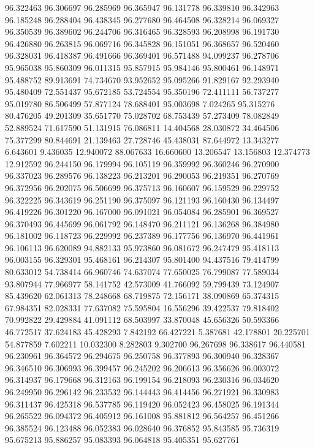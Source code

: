 96.322463
96.306697
96.285969
96.365947
96.131778
96.339810
96.342963
96.185248
96.288404
96.438345
96.277680
96.464508
96.328214
96.069327
96.350539
96.389602
96.244706
96.316465
96.328593
96.208998
96.191730
96.426880
96.263815
96.069716
96.345828
96.151051
96.368657
96.520460
96.328031
96.418387
96.491666
96.369401
96.571488
94.099237
96.278706
95.965038
95.860309
96.011315
95.857915
95.984146
95.800461
96.148971
95.488752
89.913691
74.734670
93.952652
95.095266
91.829167
92.293940
95.480409
72.551437
95.672185
53.724554
95.350196
72.411111
56.737277
95.019780
86.506499
57.877124
78.688401
95.003698
7.024265
95.315276
80.476205
49.201309
35.651770
75.028702
68.753439
57.273409
78.082849
52.889524
71.617590
51.131915
76.086811
14.404568
28.030872
34.464506
75.377299
80.844691
21.139463
27.728746
45.438031
87.644972
13.343277
6.643601
9.436035
12.940072
88.067633
16.660600
13.206547
13.156803
12.374773
12.912592
96.244150
96.179994
96.105119
96.359992
96.360246
96.270900
96.337023
96.289576
96.138223
96.213201
96.290053
96.219351
96.270769
96.372956
96.202075
96.506699
96.375713
96.160607
96.159529
96.229752
96.322225
96.343619
96.251190
96.375097
96.121193
96.160430
96.134497
96.419226
96.301220
96.167000
96.091021
96.054084
96.285901
96.369527
96.370493
96.445699
96.061792
96.148470
96.211121
96.136268
96.384980
96.181002
96.118723
96.229992
96.237389
96.177756
96.136970
96.441961
96.106113
96.620089
94.882133
95.973860
96.081672
96.247479
95.418113
96.003155
96.329301
95.468161
96.214307
95.801400
94.437516
79.414799
80.633012
54.738414
66.960746
74.637074
77.650025
76.799087
77.589034
93.807944
77.966977
58.141752
42.573009
41.766092
59.799439
73.124907
85.439620
62.061313
78.248668
68.719875
72.156171
38.090869
65.374315
67.984351
82.028331
77.637082
75.595804
16.556296
39.422537
79.818402
70.992822
29.429884
41.091112
68.503997
33.870048
45.656326
50.593366
46.772517
37.624183
45.428293
7.842192
66.427221
5.387681
42.178801
20.225701
54.877859
7.602211
10.032300
8.282803
9.302700
96.267698
96.338617
96.440581
96.230961
96.364572
96.294675
96.250758
96.377893
96.300940
96.328367
96.346510
96.306993
96.399457
96.245202
96.206613
96.356626
96.003072
96.314937
96.179668
96.312163
96.199154
96.218093
96.230316
96.034620
96.249950
96.296142
96.233532
96.144443
96.414456
96.271921
96.330983
96.311437
96.425318
96.537785
96.119420
96.052423
96.458025
96.191344
96.265522
96.094372
96.405912
96.161008
95.881812
96.564257
96.451266
96.385524
96.123488
96.052383
96.028640
96.376852
95.843585
95.736319
95.675213
95.886257
95.083393
96.064818
95.405351
95.627761
